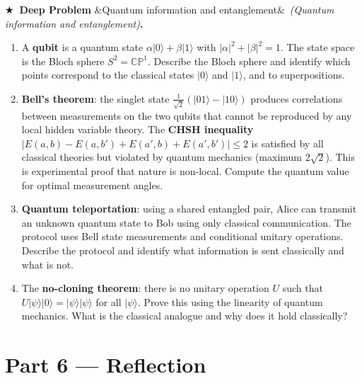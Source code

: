 \documentclass[12pt,a4paper]{article}
\newcounter{problem}
\newcounter{deepproblem}
\newenvironment{deepproblem}[1][]{\refstepcounter{deepproblem}\par\vspace{6pt}\noindent\textbf{\color{NavyBlue}$\bigstar$\ Deep Problem \thedeepproblem}\ifx&#1&\else\ \textit{(#1)}\fi\textbf{.}\enskip}{\par\vspace{4pt}}
\begin{document}
\begin{deepproblem}[Quantum information and entanglement]
\begin{enumerate}[label=(\alph*)]
  \item A \textbf{qubit} is a quantum state $\alpha|0\rangle+\beta|1\rangle$ with $|\alpha|^2+|\beta|^2=1$. The state space is the Bloch sphere $S^2 = \mathbb{CP}^1$. Describe the Bloch sphere and identify which points correspond to the classical states $|0\rangle$ and $|1\rangle$, and to superpositions.
  \item \textbf{Bell's theorem}: the singlet state $\frac{1}{\sqrt{2}}(|01\rangle-|10\rangle)$ produces correlations between measurements on the two qubits that cannot be reproduced by any local hidden variable theory. The \textbf{CHSH inequality} $|E(a,b)-E(a,b')+E(a',b)+E(a',b')|\leq 2$ is satisfied by all classical theories but violated by quantum mechanics (maximum $2\sqrt{2}$). This is experimental proof that nature is non-local. Compute the quantum value for optimal measurement angles.
  \item \textbf{Quantum teleportation}: using a shared entangled pair, Alice can transmit an unknown quantum state to Bob using only classical communication. The protocol uses Bell state measurements and conditional unitary operations. Describe the protocol and identify what information is sent classically and what is not.
  \item The \textbf{no-cloning theorem}: there is no unitary operation $U$ such that $U|\psi\rangle|0\rangle = |\psi\rangle|\psi\rangle$ for all $|\psi\rangle$. Prove this using the linearity of quantum mechanics. What is the classical analogue and why does it hold classically?
\end{enumerate}
\end{deepproblem}

\section{Part 6 \texorpdfstring{---}{--} Reflection}
\end{document}
